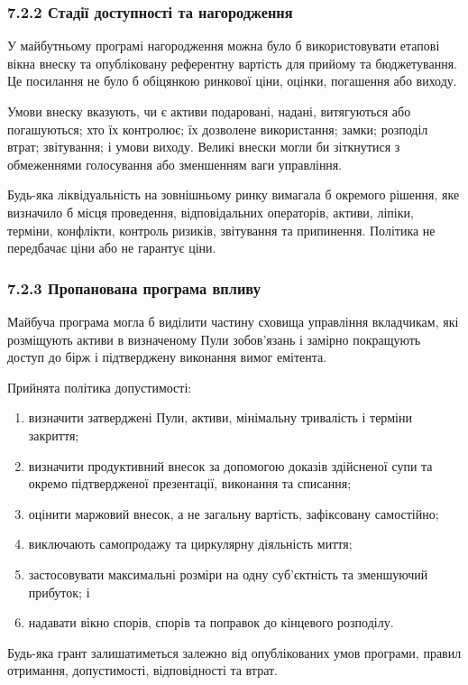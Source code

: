 \documentclass[11pt]{article}
\begin{document}
\subsubsection*{7.2.2 Стадії доступності та нагородження}

У майбутньому програмі нагородження можна було б використовувати етапові вікна внеску та опубліковану референтну вартість для прийому та бюджетування. Це посилання не було б обіцянкою ринкової ціни, оцінки, погашення або виходу.

Умови внеску вказують, чи є активи подаровані, надані, витягуються або погашуються; хто їх контролює; їх дозволене використання; замки; розподіл втрат; звітування; і умови виходу. Великі внески могли би зіткнутися з обмеженнями голосування або зменшенням ваги управління.

Будь-яка ліквідуальність на зовнішньому ринку вимагала б окремого рішення, яке визначило б місця проведення, відповідальних операторів, активи, ліпіки, терміни, конфлікти, контроль ризиків, звітування та припинення. Політика не передбачає ціни або не гарантує ціни.

\subsubsection*{7.2.3 Пропанована програма впливу}

Майбуча програма могла б виділити частину сховища управління вкладчикам, які розміщують активи в визначеному Пули зобов'язань і замірно покращують доступ до бірж і підтверджену виконання вимог емітента.

Прийнята політика допустимості:

\begin{enumerate}[leftmargin=*]
\item визначити затверджені Пули, активи, мінімальну тривалість і терміни закриття;
\item визначити продуктивний внесок за допомогою доказів здійсненої супи та окремо підтвердженої презентації, виконання та списання;
\item оцінити маржовий внесок, а не загальну вартість, зафіксовану самостійно;
\item виключають самопродажу та циркулярну діяльність миття;
\item застосовувати максимальні розміри на одну суб'єктність та зменшуючий прибуток; і
\item надавати вікно спорів, спорів та поправок до кінцевого розподілу.
\end{enumerate}
Будь-яка грант залишатиметься залежно від опублікованих умов програми, правил отримання, допустимості, відповідності та втрат.
\end{document}

